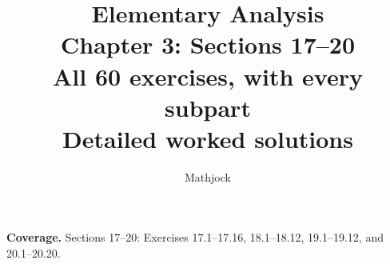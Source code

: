 
\title{\textbf{Elementary Analysis}\\[0.3em]
Chapter 3: Sections 17--20\\[0.4em]
\large All 60 exercises, with every subpart\\
Detailed worked solutions}
\author{Mathjock}
\date{}

\maketitle
\bookinfo
\par\textbf{Coverage.} Sections 17--20: Exercises 17.1--17.16,
18.1--18.12, 19.1--19.12, and 20.1--20.20.
\tableofcontents
\clearpage
\setcounter{section}{16}

\clearpage

\clearpage

\clearpage


